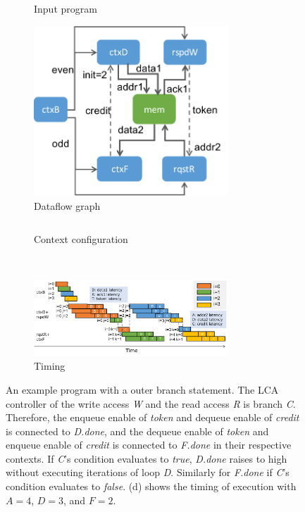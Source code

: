 \begin{figure}
\centering
  \vspace{-1cm}
\begin{subfigure}[b]{0.45\textwidth}
\inputminted{python}{code/branch.py}
\caption{Input program}
  \vspace{0.2cm}
\includegraphics[width=0.8\textwidth]{figs/branchctx.pdf}
\caption{Dataflow graph}
\end{subfigure}
\hfill
\begin{subfigure}[b]{0.48\textwidth}
\inputminted{python}{code/branchctx.py}
\caption{Context configuration}
\end{subfigure}
\\
  \vspace{0.2cm}
\begin{subfigure}[b]{\textwidth}
  \centering
\includegraphics[width=0.8\textwidth]{figs/branchtiming.pdf}
\caption{Timing}
\end{subfigure}
\caption[Branching example]{
  An example program with a outer branch statement. 
  The LCA controller of the write access \emph{W} and the read access \emph{R} is branch \emph{C}.
  Therefore, the enqueue enable of \emph{token} and dequeue enable of \emph{credit} is connected to
  \emph{D.done}, and the dequeue enable of \emph{token} and enqueue enable of \emph{credit} is
  connected to \emph{F.done} in their respective contexts.
  If \emph{C}'s condition evaluates to \emph{true}, \emph{D.done} raises to high without executing
  iterations of loop \emph{D}. Similarly for \emph{F.done} if \emph{C}'s condition evaluates to
  \emph{false}.
  (d) shows the timing of execution with $A=4$, $D=3$, and $F=2$.
}
\label{fig:branch} 
\end{figure}


